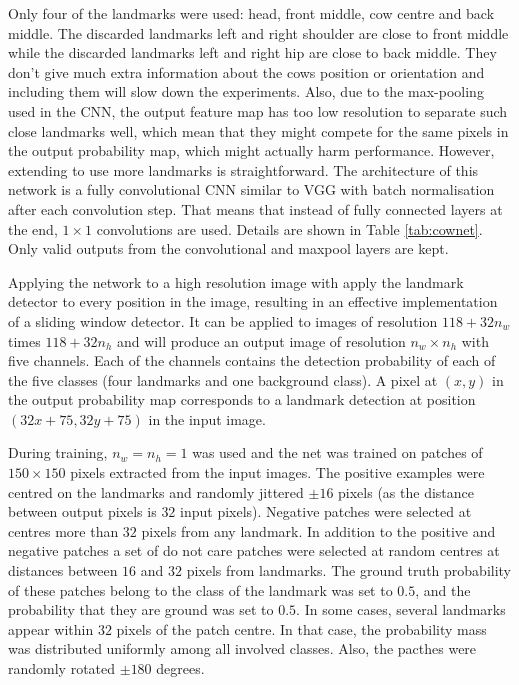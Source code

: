 \documentclass{cta-author}
\begin{document}
Only four of the landmarks were used: head, front middle, cow centre and back middle. 
The discarded landmarks left and right shoulder are close to front middle while the discarded landmarks left 
and right hip are close to back middle. They don't give much extra information about the cows position or 
orientation and including them will slow down the experiments. Also, due to the max-pooling used in the CNN, 
the output feature map has too low resolution to separate such close landmarks well, which mean that they 
might compete for the same pixels in the output probability map, which might actually harm performance. 
However, extending to use more landmarks is straightforward. The architecture of this network is a fully 
convolutional CNN similar to VGG \cite{Simonyan14c} with batch normalisation 
\cite{DBLP:journals/corr/IoffeS15} after each convolution step. That means that instead of fully connected 
layers at the end, $1 \times 1$ convolutions are used. Details are shown in Table \ref{tab:cownet}. Only 
valid outputs from the convolutional and maxpool layers are kept.

Applying the network to a high resolution image with apply the landmark detector to every position in the 
image, resulting in an effective implementation of a sliding window detector. It can be applied to images of 
resolution $118 + 32 n_w$ times $118 + 32 n_h$ and will produce an output image of resolution $n_w \times 
n_h$ with five channels. Each of the channels contains the detection probability of each of the five classes 
(four landmarks and one background class). A pixel at $\left(x, y\right)$ in the output probability map 
corresponds to a landmark detection at position $\left(32 x + 75, 32 y + 75\right)$ in the input image.

During training, $n_w = n_h = 1$ was used and the net was trained on patches of $150\times 150$ pixels 
extracted from the input images. The positive examples were centred on the landmarks and randomly jittered 
$\pm 16$ pixels (as the distance between output pixels is $32$ input pixels). Negative patches were selected 
at centres more than $32$ pixels from any landmark. In addition to the positive and negative patches a set of 
do not care patches were selected at random centres at distances between $16$ and $32$ pixels from landmarks. 
The ground truth probability of these patches belong to the class of the landmark was set to $0.5$, and the 
probability that they are ground was set to $0.5$. In some cases, several landmarks appear within $32$ pixels 
of the patch centre. In that case, the probability mass was distributed uniformly among all involved classes. 
Also, the pacthes were randomly rotated $\pm 180$ degrees. 
\end{document}
